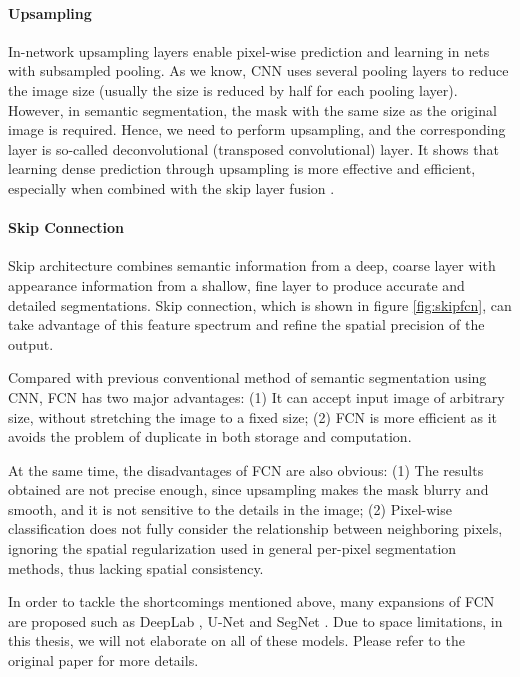

\paragraph{Upsampling}
In-network upsampling layers enable pixel-wise prediction and learning in nets with subsampled pooling. As we know, CNN uses several pooling layers to reduce the image size (usually the size is reduced by half for each pooling layer). However, in semantic segmentation, the mask with the same size as the original image is required. Hence, we need to perform upsampling, and the corresponding layer is so-called deconvolutional (transposed convolutional) layer. It shows that learning dense prediction through upsampling is more effective and efficient, especially when combined with the skip layer fusion \cite{fcn}.

\paragraph{Skip Connection}
Skip architecture combines semantic information from a deep, coarse layer with appearance information from a shallow, fine layer to produce accurate and detailed segmentations. Skip connection, which is shown in figure \ref{fig:skipfcn}, can take advantage of this feature spectrum and refine the spatial precision of the output.



Compared with previous conventional method of semantic segmentation using CNN, FCN has two major advantages: (1) It can accept input image of arbitrary size, without stretching the image to a fixed size; (2) FCN is more efficient as it avoids the problem of duplicate in both storage and computation.

At the same time, the disadvantages of FCN are also obvious: (1) The results obtained are not precise enough, since upsampling makes the mask blurry and smooth, and it is not sensitive to the details in the image; (2) Pixel-wise classification does not fully consider the relationship between neighboring pixels, ignoring the spatial regularization used in general per-pixel segmentation methods, thus lacking spatial consistency.

In order to tackle the shortcomings mentioned above, many expansions of FCN are proposed such as DeepLab \cite{deeplab}, U-Net \cite{unet} and SegNet \cite{segnet}. Due to space limitations, in this thesis, we will not elaborate on all of these models. Please refer to the original paper for more details.

